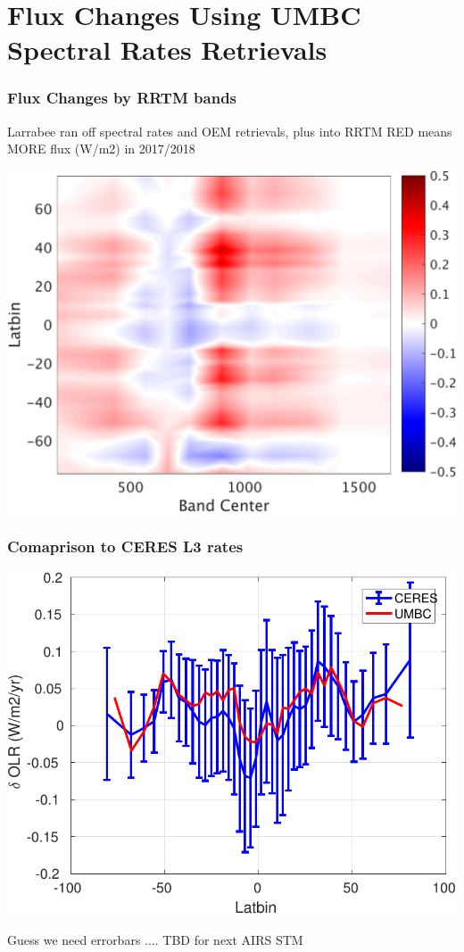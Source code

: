 \documentclass[10pt,t]{beamer}
\begin{document}
\section{Flux Changes Using UMBC Spectral Rates Retrievals}
\begin{frame}
  \frametitle{Flux Changes by RRTM bands}
  Larrabee ran off spectral rates and OEM retrievals, plus into RRTM
  RED means MORE flux (W/m2) in 2017/2018 \newline
  \begin{center}
    \noindent\includegraphics[width=0.625\linewidth]{Figs/umbc_vs_band_fluxrates.png}
  \end{center}
\end{frame}
\begin{frame}
  \frametitle{Comaprison to CERES L3 rates}
  \begin{center}
    \noindent\includegraphics[width=0.625\linewidth]{Figs/umbc_vs_ceres_fluxrates.pdf}
  \end{center}
 Guess we need errorbars .... TBD for next AIRS STM
\end{frame}
\end{document}
